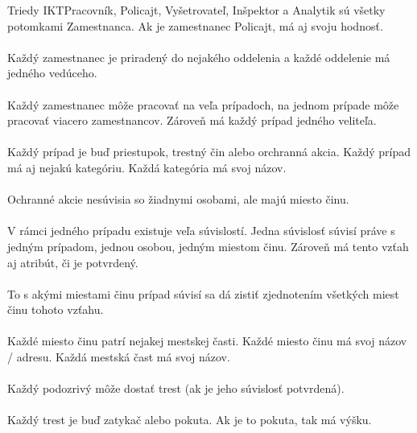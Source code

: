 \documentclass[11pt,a4paper]{article}
\begin{document}
    Triedy IKTPracovník, Policajt, Vyšetrovateľ, Inšpektor a Analytik sú všetky potomkami Zamestnanca. Ak je zamestnanec Policajt, má aj svoju hodnosť.
    \\
    \\
    Každý zamestnanec je priradený do nejakého oddelenia a každé oddelenie má jedného vedúceho.
    \\
    \\
    Každý zamestnanec môže pracovať na veľa prípadoch, na jednom prípade môže pracovať viacero zamestnancov. Zároveň má každý prípad jedného veliteľa.
    \\
    \\
    Každý prípad je buď priestupok, trestný čin alebo orchranná akcia. Každý prípad má aj nejakú kategóriu. Každá kategória má svoj názov.
    \\
    \\
    Ochranné akcie nesúvisia so žiadnymi osobami, ale majú miesto činu.
    \\
    \\
    V rámci jedného prípadu existuje veľa súvislostí. Jedna súvislosť súvisí práve s jedným prípadom, jednou osobou, jedným miestom činu. Zároveň má tento vzťah aj atribút, či je potvrdený.
    \\
    \\
    To s akými miestami činu prípad súvisí sa dá zistiť zjednotením všetkých miest činu tohoto vzťahu.
    \\
    \\
    Každé miesto činu patrí nejakej mestskej časti. Každé miesto činu má svoj názov / adresu. Každá mestská čast má svoj názov.
    \\
    \\
    Každý podozrivý môže dostať trest (ak je jeho súvislosť potvrdená).
    \\
    \\
    Každý trest je buď zatykač alebo pokuta. Ak je to pokuta, tak má výšku.
    \\
    \\
\end{document}

